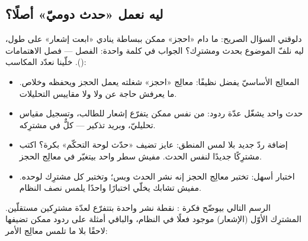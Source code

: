 \subsection{ليه نعمل «حدث دوميّ» أصلًا؟}

دلوقتي السؤال الصريح: ما دام «احجز» ممكن ببساطة ينادي «ابعت إشعار» على طول، ليه
نلفّ الموضوع بحدث ومشترِك؟ الجواب في كلمة واحدة: الفصل — فصل الاهتمامات
(). خلّينا نعدّد المكاسب:

\begin{itemize}
\item المعالِج الأساسيّ يفضل نظيفًا: معالِج «احجز» شغلته يعمل الحجز ويحفظه
  وخلاص. ما يعرفش حاجة عن  ولا  ولا مقاييس التحليلات.
\item حدث واحد يشغّل عدّة ردود: من نفس  ممكن
  يتفرّع إشعار للطالب، وتسجيل مقياس تحليليّ، وبريد تذكير — كلٌّ في مشترِكه.
\item إضافة ردّ جديد بلا لمس المنطق: عايز تضيف «حدّث لوحة التحكّم» بكرة؟
  اكتب مشترِكًا جديدًا لنفس الحدث. مفيش سطر واحد بيتغيّر في معالِج الحجز.
\item اختبار أسهل: تختبر معالِج الحجز إنه نشر الحدث وبس؛ وتختبر كل
  مشترِك لوحده. مفيش تشابك يخلّي اختبارًا واحدًا يلمس نصف النظام.
\end{itemize}

الرسم التالي بيوضّح فكرة : نقطة نشر واحدة بتتفرّع لعدّة مشترِكين
مستقلّين. المشترِك الأوّل (الإشعار) موجود فعلًا في النظام، والباقي أمثلة على ردود
ممكن تضيفها لاحقًا بلا ما تلمس معالِج الأمر:

\begin{center}\begin{LTR}
\end{LTR}\end{center}

